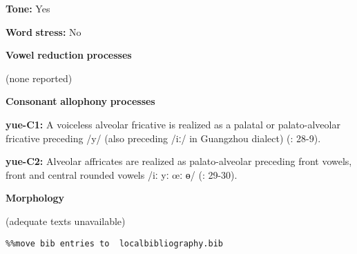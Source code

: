 \documentclass[output=paper]{langsci/langscibook}
\begin{document}
\begin{styleBody}
\textbf{Tone:} Yes
\end{styleBody}

\begin{styleBody}
\textbf{Word} \textbf{stress:} No
\end{styleBody}

\begin{styleBody}
\textbf{Vowel} \textbf{reduction} \textbf{processes}
\end{styleBody}

\begin{styleBody}
(none reported)
\end{styleBody}

\begin{styleBody}
\textbf{Consonant} \textbf{allophony} \textbf{processes}
\end{styleBody}

\begin{styleBody}
\textbf{yue-C1:} A voiceless alveolar fricative is realized as a palatal or palato-alveolar fricative preceding /y/ (also preceding /iː/ in Guangzhou dialect) (\citealt{BauerBenedict1997}: 28-9).
\end{styleBody}

\begin{styleBody}
\textbf{yue-C2:} Alveolar affricates are realized as palato-alveolar preceding front vowels, front and central rounded vowels /iː yː œː ɵ/ (\citealt{BauerBenedict1997}: 29-30).
\end{styleBody}

\begin{styleBody}
\textbf{Morphology}
\end{styleBody}

\begin{styleBody}
(adequate texts unavailable)
\end{styleBody}

\begin{verbatim}%%move bib entries to  localbibliography.bib
\end{verbatim}
\sloppy\printbibliography[heading=subbibliography,notkeyword=this]
\end{document}
